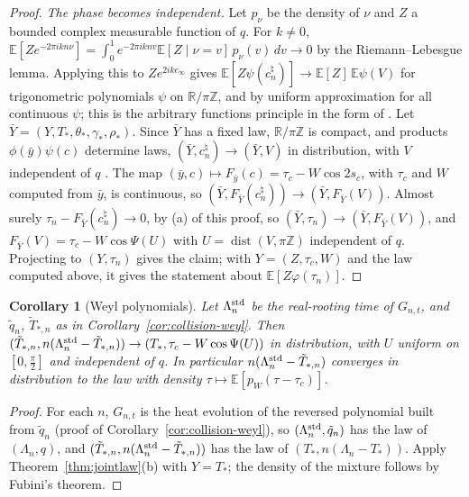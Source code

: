 \documentclass[11pt]{amsart}
\newtheorem{corollary}[theorem]{Corollary}
\theoremstyle{definition}
\theoremstyle{remark}
\numberwithin{equation}{section}
\newcommand{\R}{\mathbb{R}}
\newcommand{\Z}{\mathbb{Z}}
\newcommand{\E}{\mathbb{E}}
\DeclareMathOperator{\dist}{dist}
\begin{document}
\begin{proof}
\emph{The phase becomes independent.} Let $p_\nu$ be the density of $\nu$ and $Z$ a bounded complex measurable
function of $q$. For $k\ne0$, $\E[Ze^{-2\pi ikn\nu}]=\int_0^1e^{-2\pi iknv}\E[Z\mid\nu=v]\,p_\nu(v)\,dv\to0$ by the
Riemann--Lebesgue lemma. Applying this to $Ze^{2ikc_\infty}$ gives $\E[Z\psi(c_n^\natural)]\to\E[Z]\,\E\psi(V)$ for
trigonometric polynomials $\psi$ on $\R/\pi\Z$, and by uniform approximation for all continuous $\psi$; this is
the arbitrary functions principle in the form of \cite[eq.~(1)]{Bou}. Let $\bar Y=(Y,T_*,\theta_*,\gamma_*,\rho_*)$. Since $\bar Y$ has a fixed law, $\R/\pi\Z$ is compact,
and products $\phi(\bar y)\psi(c)$ determine laws, $(\bar Y,c_n^\natural)\to(\bar Y,V)$ in distribution, with $V$
independent of $q$ \cite{Bi2}. The map $(\bar y,c)\mapsto F_{\bar y}(c)=\tau_c-W\cos2s_c$, with $\tau_c$ and $W$ computed
from $\bar y$, is continuous, so $(\bar Y,F_{\bar Y}(c_n^\natural))\to(\bar Y,F_{\bar Y}(V))$. Almost surely
$\tau_n-F_{\bar Y}(c_n^\natural)\to0$, by (a) of this proof, so $(\bar Y,\tau_n)\to(\bar Y,F_{\bar Y}(V))$, and
$F_{\bar Y}(V)=\tau_c-W\cos\Psi(U)$ with $U=\dist(V,\pi\Z)$ independent of $q$. Projecting to $(Y,\tau_n)$ gives the
claim; with $Y=(Z,\tau_c,W)$ and the law computed above, it gives the statement about $\E[Z\varphi(\tau_n)]$.
\end{proof}

\begin{corollary}[Weyl polynomials]\label{cor:firstorder-weyl}
Let $\Lambda_n^{\rm std}$ be the real-rooting time of $G_{n,t}$, and $\tilde q_n$, $\tilde T_{*,n}$ as in
Corollary~\ref{cor:collision-weyl}. Then $(\tilde T_{*,n},n(\Lambda_n^{\rm std}-\tilde T_{*,n}))\to(T_*,\tau_c-W\cos\Psi(U))$ in
distribution, with $U$ uniform on $[0,\frac\pi2]$ and independent of $q$. In particular $n(\Lambda_n^{\rm std}-\tilde T_{*,n})$
converges in distribution to the law with density $\tau\mapsto\E[p_W(\tau-\tau_c)]$.
\end{corollary}

\begin{proof}
For each $n$, $G_{n,t}$ is the heat evolution of the reversed polynomial built from $\tilde q_n$ (proof of
Corollary~\ref{cor:collision-weyl}), so $(\Lambda_n^{\rm std},\tilde q_n)$ has the law of $(\Lambda_n,q)$, and
$(\tilde T_{*,n},n(\Lambda_n^{\rm std}-\tilde T_{*,n}))$ has the law of $(T_*,n(\Lambda_n-T_*))$. Apply
Theorem~\ref{thm:jointlaw}(b) with $Y=T_*$; the density of the mixture follows by Fubini's theorem.
\end{proof}
\end{document}
